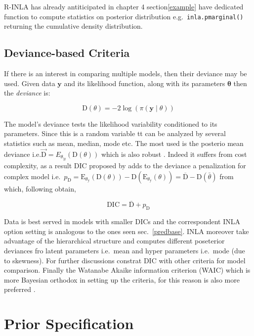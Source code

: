 \documentclass[
  12pt,
  a4paper,
  oneside]{book}
\newcommand{\passthrough}[1]{#1}
\theoremstyle{definition}
\theoremstyle{definition}
\theoremstyle{definition}
\theoremstyle{remark}
\begin{document}
R-INLA has already antiticipated in chapter 4 section\ref{example} have dedicated function to compute statistics on posterior distribution e.g.~\passthrough{\lstinline!inla.pmarginal()!} returning the cumulative density distribution.

\hypertarget{deviance-based-criteria}{%
\subsection{Deviance-based Criteria}\label{deviance-based-criteria}}

If there is an interest in comparing multiple models, then their deviance may be used. Given data \(\boldsymbol{y}\) and its likelihood function, along with its parameters \(\boldsymbol\theta\) then the \emph{deviance} is:

\[
\mathrm{D}(\theta)=-2 \log (\pi(\boldsymbol{y} \mid \theta))
\]

The model's deviance tests the likelihood variability conditioned to its parameters. Since this is a random variable tt can be analyzed by several statistics such as mean, median, mode etc. The most used is the posterio mean deviance i.e.\(\overrightarrow{\mathrm{D}}=E_{\theta_{\mid y}}(\mathrm{D}(\theta))\) which is also robust \citep{Blangiaro-Cameletti}. Indeed it suffers from cost complexity, as a result DIC proposed by \citet{spiegelhalter2002bayesian} adds to the deviance a penalization for complex model i.e.~\(p_{\mathrm{D}}=\mathrm{E}_{\theta_{\mathrm{y}}}(\mathrm{D}(\theta))-\mathrm{D}\left(\mathrm{E}_{\theta_{\mathrm{y}}}(\theta)\right)=\overline{\mathrm{D}}-\mathrm{D}(\bar{\theta})\) from which, following \citet{Blangiaro-Cameletti} obtain,

\[\mathrm{DIC}=\overline{\mathrm{D}}+p_{\mathrm{D}}\]

Data is best served in models with smaller DICs and the correspondent INLA option setting is analogous to the ones seen sec.~\ref{predbase}. INLA moreover take advantage of the hierarchical structure and computes different poseterior deviances fro latent parameters i.e.~mean and hyper parameters i.e.~mode (due to skewness). For further discussions \citet{spiegelhalter2014deviance} constrat DIC with other criteria for model comparison. Finally the Watanabe Akaike information criterion (WAIC) which is more Bayesian orthodox in setting up the criteria, for this reason is also more preferred \citep{gelman2014understanding}.

\hypertarget{priorsspec}{%
\section{Prior Specification}\label{priorsspec}}
\end{document}
